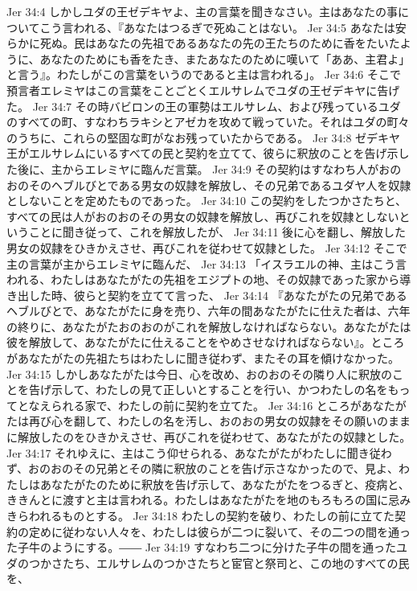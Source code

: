 Jer 34:4  しかしユダの王ゼデキヤよ、主の言葉を聞きなさい。主はあなたの事についてこう言われる、『あなたはつるぎで死ぬことはない。
Jer 34:5  あなたは安らかに死ぬ。民はあなたの先祖であるあなたの先の王たちのために香をたいたように、あなたのためにも香をたき、またあなたのために嘆いて「ああ、主君よ」と言う』。わたしがこの言葉をいうのであると主は言われる」。
Jer 34:6  そこで預言者エレミヤはこの言葉をことごとくエルサレムでユダの王ゼデキヤに告げた。
Jer 34:7  その時バビロンの王の軍勢はエルサレム、および残っているユダのすべての町、すなわちラキシとアゼカを攻めて戦っていた。それはユダの町々のうちに、これらの堅固な町がなお残っていたからである。
Jer 34:8  ゼデキヤ王がエルサレムにいるすべての民と契約を立てて、彼らに釈放のことを告げ示した後に、主からエレミヤに臨んだ言葉。
Jer 34:9  その契約はすなわち人がおのおのそのヘブルびとである男女の奴隷を解放し、その兄弟であるユダヤ人を奴隷としないことを定めたものであった。
Jer 34:10  この契約をしたつかさたちと、すべての民は人がおのおのその男女の奴隷を解放し、再びこれを奴隷としないということに聞き従って、これを解放したが、
Jer 34:11  後に心を翻し、解放した男女の奴隷をひきかえさせ、再びこれを従わせて奴隷とした。
Jer 34:12  そこで主の言葉が主からエレミヤに臨んだ、
Jer 34:13  「イスラエルの神、主はこう言われる、わたしはあなたがたの先祖をエジプトの地、その奴隷であった家から導き出した時、彼らと契約を立てて言った、
Jer 34:14  『あなたがたの兄弟であるヘブルびとで、あなたがたに身を売り、六年の間あなたがたに仕えた者は、六年の終りに、あなたがたおのおのがこれを解放しなければならない。あなたがたは彼を解放して、あなたがたに仕えることをやめさせなければならない』。ところがあなたがたの先祖たちはわたしに聞き従わず、またその耳を傾けなかった。
Jer 34:15  しかしあなたがたは今日、心を改め、おのおのその隣り人に釈放のことを告げ示して、わたしの見て正しいとすることを行い、かつわたしの名をもってとなえられる家で、わたしの前に契約を立てた。
Jer 34:16  ところがあなたがたは再び心を翻して、わたしの名を汚し、おのおの男女の奴隷をその願いのままに解放したのをひきかえさせ、再びこれを従わせて、あなたがたの奴隷とした。
Jer 34:17  それゆえに、主はこう仰せられる、あなたがたがわたしに聞き従わず、おのおのその兄弟とその隣に釈放のことを告げ示さなかったので、見よ、わたしはあなたがたのために釈放を告げ示して、あなたがたをつるぎと、疫病と、ききんとに渡すと主は言われる。わたしはあなたがたを地のもろもろの国に忌みきらわれるものとする。
Jer 34:18  わたしの契約を破り、わたしの前に立てた契約の定めに従わない人々を、わたしは彼らが二つに裂いて、その二つの間を通った子牛のようにする。――
Jer 34:19  すなわち二つに分けた子牛の間を通ったユダのつかさたち、エルサレムのつかさたちと宦官と祭司と、この地のすべての民を、
